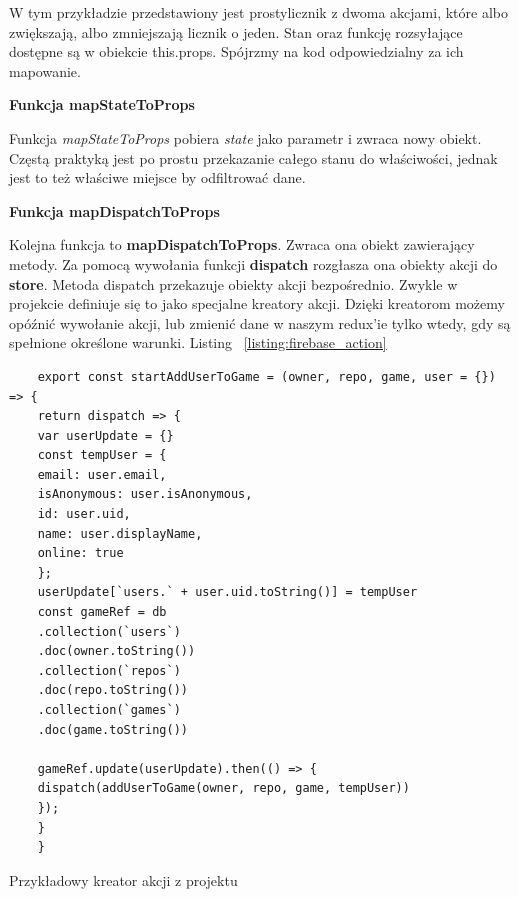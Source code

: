 W tym przykładzie przedstawiony jest prostylicznik z dwoma akcjami,
które albo zwiększają, albo zmniejszają licznik o jeden.
Stan oraz funkcję rozsyłające dostępne są w obiekcie this.props. Spójrzmy na kod odpowiedzialny za ich mapowanie.
\begin{center}
	\textbf{Funkcja mapStateToProps}
\end{center}
Funkcja \textit{mapStateToProps} pobiera \textit{state} jako parametr i zwraca nowy obiekt.
Częstą praktyką jest po prostu przekazanie całego stanu do właściwości, jednak jest to też właściwe miejsce by odfiltrować dane.
\begin{center}
	\textbf{Funkcja mapDispatchToProps}
\end{center}
Kolejna funkcja to \textbf{mapDispatchToProps}. Zwraca ona obiekt zawierający metody.
Za pomocą wywołania funkcji \textbf{dispatch} rozgłasza ona obiekty akcji do \textbf{store}.
Metoda dispatch przekazuje obiekty akcji bezpośrednio.
Zwykle w projekcie definiuje się to jako specjalne kreatory akcji. Dzięki kreatorom możemy opóźnić wywołanie akcji,
lub zmienić dane w naszym redux'ie tylko wtedy, gdy są spełnione określone warunki. Listing
~\ref{listing:firebase_action}

\begin{listing}
	\begin{verbatim}
	export const startAddUserToGame = (owner, repo, game, user = {}) => {
	return dispatch => {
	var userUpdate = {}
	const tempUser = {
	email: user.email,
	isAnonymous: user.isAnonymous,
	id: user.uid,
	name: user.displayName,
	online: true
	};
	userUpdate[`users.` + user.uid.toString()] = tempUser
	const gameRef = db
	.collection(`users`)
	.doc(owner.toString())
	.collection(`repos`)
	.doc(repo.toString())
	.collection(`games`)
	.doc(game.toString())

	gameRef.update(userUpdate).then(() => {
	dispatch(addUserToGame(owner, repo, game, tempUser))
	});
	}
	}
	\end{verbatim}
	\caption{Przykładowy kreator akcji z projektu} \label{listing:firebase_action}
\end{listing}

